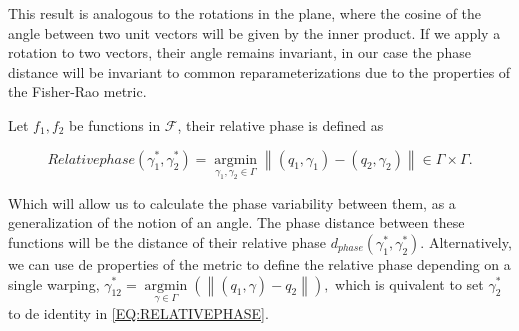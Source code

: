 This result is analogous to the rotations in the plane, where the cosine of
the angle between two unit vectors will be given by the inner product.
If we apply a rotation to two vectors, their angle remains invariant, in our
case the phase distance will be invariant to common reparameterizations due to
the properties of the Fisher-Rao metric.

Let $f_1, f_2$ be functions in $\mathcal{F}$, their relative phase is defined as

\begin{equation}[EQ:RELATIVEPHASE]{Relative phase}
\left(\gamma_{1}^{*}, \gamma_{2}^{*}\right)=\underset{\gamma_{1}, \gamma_{2} \in \Gamma}{\operatorname{argmin}}\left\|\left(q_{1}, \gamma_{1}\right)-\left(q_{2}, \gamma_{2}\right)\right\| \in \Gamma \times \Gamma.
\end{equation}

Which will allow us to calculate the phase variability between them,
as a generalization of the notion of an angle. The phase distance between these
functions will be the distance of their relative phase
$d_{phase} (\gamma_{1}^{*}, \gamma_{2}^{*})$. Alternatively, we can use de properties of
the metric to define the relative phase depending on a single warping,
$
\gamma_{12}^{*}=\underset{\gamma \in \Gamma}{\operatorname{argmin}}\left(\left\|\left(q_{1}, \gamma \right)- q_{2}\right\|\right),
$
which is quivalent to set $\gamma_2^*$ to de identity in \ref{EQ:RELATIVEPHASE}.
